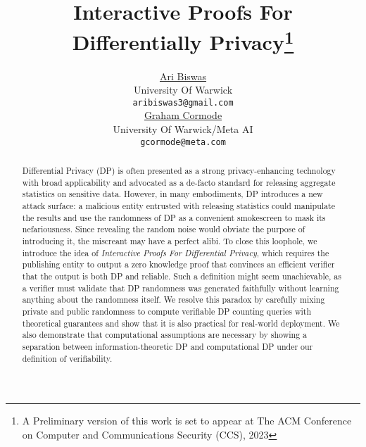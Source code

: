\documentclass{article}
\title{Interactive Proofs For Differentially Privacy\thanks{A Preliminary version of this work is set to appear at The ACM Conference on Computer and Communications Security (CCS), 2023}}
\author{\href{https://abiswas3.github.io}{Ari Biswas}\\
	University Of Warwick\\
	\texttt{aribiswas3@gmail.com} \\
	\AND
	\href{https://warwick.ac.uk/fac/sci/dcs/people/graham_cormode/}{Graham Cormode}\\
	University Of Warwick/Meta AI \\
	\texttt{gcormode@meta.com}
}
\begin{document}
\maketitle

\begin{abstract}
  Differential Privacy (DP) is often presented as a strong
  privacy-enhancing technology with broad applicability and advocated
  as a de-facto standard for releasing aggregate statistics on
  sensitive data.  However, in many embodiments, DP introduces a new
  attack surface: a malicious entity entrusted with releasing
  statistics could manipulate the results and use the randomness of DP
  as a convenient smokescreen to mask its nefariousness.  Since
  revealing the random noise would obviate the purpose of introducing
  it, the miscreant may have a perfect alibi.  To close this loophole,
  we introduce the idea of \textit{Interactive Proofs For Differential
    Privacy}, which requires the publishing entity to output a zero
  knowledge proof that convinces an efficient verifier that the output
  is both DP and reliable.  Such a definition might seem unachievable,
  as a verifier must validate that DP randomness was generated
  faithfully without learning anything about the randomness itself.
  We resolve this paradox by carefully mixing private and public
  randomness to compute verifiable DP counting queries with
  theoretical guarantees and show that it is also practical for
  real-world deployment.  We also demonstrate that computational
  assumptions are necessary by showing a separation between
  information-theoretic DP and computational DP under our definition
  of verifiability.
\end{abstract}














\appendix


\appendix
\end{document}

